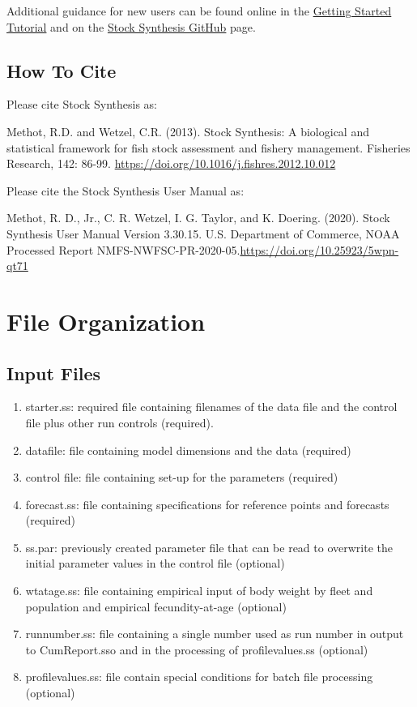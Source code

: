 Additional guidance for new users can be found online in the \href{https://nmfs-stock-synthesis.github.io/doc/Getting_Started_SS.html}{Getting Started Tutorial} and on the \href{https://github.com/nmfs-stock-synthesis/stock-synthesis#how-can-i-learn-how-to-use-stock-synthesis}{Stock Synthesis GitHub} page. 

  \subsection{How To Cite}
  
Please cite Stock Synthesis as:

Methot, R.D. and Wetzel, C.R. (2013). Stock Synthesis: A biological and statistical
framework for fish stock assessment and fishery management. Fisheries Research, 
142: 86-99. \href{https://doi.org/10.1016/j.fishres.2012.10.012}{https://doi.org/10.1016/j.fishres.2012.10.012}

Please cite the Stock Synthesis User Manual as:

Methot, R. D., Jr., C. R. Wetzel, I. G. Taylor, and K. Doering. (2020). Stock Synthesis User Manual Version 3.30.15. U.S. Department of Commerce, NOAA Processed Report NMFS-NWFSC-PR-2020-05.\href{https://doi.org/10.25923/5wpn-qt71}{https://doi.org/10.25923/5wpn-qt71}

\pagebreak
		
\section{File Organization}\label{FileOrganization}		
	\subsection{Input Files}
	\begin{enumerate}
		\item starter.ss: required file containing filenames of the data file and the control file plus other run controls (required).
		\item datafile: file containing model dimensions and the data (required)
		\item control file: file containing set-up for the parameters (required)
		\item forecast.ss: file containing specifications for reference points and forecasts (required) 
		\item ss.par: previously created parameter file that can be read to overwrite the initial parameter values in the control file (optional)
		\item wtatage.ss: file containing empirical input of body weight by fleet and population and empirical fecundity-at-age (optional)
		\item runnumber.ss: file containing a single number used as run number in output to CumReport.sso and in the processing of profilevalues.ss (optional)
		\item profilevalues.ss: file contain special conditions for batch file processing (optional)
	\end{enumerate}
	
